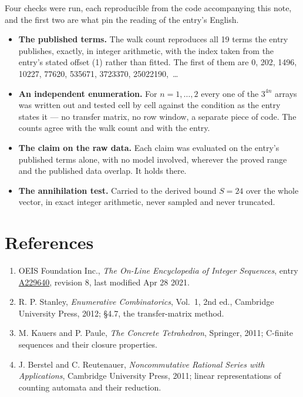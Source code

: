 \documentclass[11pt]{article}
\theoremstyle{definition}
\begin{document}
Four checks were run, each reproducible from the code accompanying this note, and the first two are what pin the reading of the entry's English.

\begin{itemize}

\item {\bfseries The published terms.} The walk count reproduces all 19 terms the entry publishes, exactly, in integer arithmetic, with the index taken from the entry's stated offset (1) rather than fitted. The first of them are 0, 202, 1496, 10227, 77620, 535671, 3723370, 25022190,~\dots

\item {\bfseries An independent enumeration.} For $n = 1,\dots,2$ every one of the $3^{4n}$ arrays was written out and tested cell by cell against the condition as the entry states it --- no transfer matrix, no row window, a separate piece of code. The counts agree with the walk count and with the entry.

\item {\bfseries The claim on the raw data.} Each claim was evaluated on the entry's published terms alone, with no model involved, wherever the proved range and the published data overlap. It holds there.

\item {\bfseries The annihilation test.} Carried to the derived bound $S = 24$ over the whole vector, in exact integer arithmetic, never sampled and never truncated.

\end{itemize}

\section{References}

\begin{enumerate}

\item OEIS Foundation Inc., \emph{The On-Line Encyclopedia of Integer Sequences}, entry \href{https://oeis.org/A229640}{A229640}, revision 8, last modified Apr 28 2021.

\item R. P. Stanley, \emph{Enumerative Combinatorics}, Vol.~1, 2nd ed., Cambridge University Press, 2012; \S4.7, the transfer-matrix method.

\item M. Kauers and P. Paule, \emph{The Concrete Tetrahedron}, Springer, 2011; C-finite sequences and their closure properties.

\item J. Berstel and C. Reutenauer, \emph{Noncommutative Rational Series with Applications}, Cambridge University Press, 2011; linear representations of counting automata and their reduction.

\end{enumerate}
\end{document}
